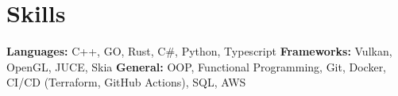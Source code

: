 \vspace{5 pt - 0.5 cm}
\section{Skills}
\begin{onecolentry}
    \textbf{Languages:} C++, GO, Rust, C\#, Python, Typescript \newline
    \textbf{Frameworks:} Vulkan, OpenGL, JUCE, Skia  \newline
    \textbf{General:} OOP, Functional Programming, Git, Docker, CI/CD (Terraform, GitHub Actions), SQL, AWS \newline
\end{onecolentry} 